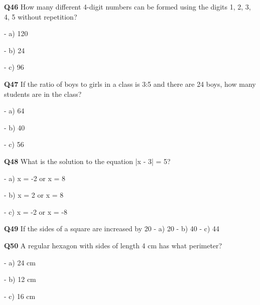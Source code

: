 \textbf{Q46} How many different 4-digit numbers can be formed using the digits 1, 2, 3, 4, 5 without repetition?\par
\quad - a) 120\par
\quad - b) 24\par
\quad - c) 96\par

\textbf{Q47} If the ratio of boys to girls in a class is 3:5 and there are 24 boys, how many students are in the class?\par
\quad - a) 64\par
\quad - b) 40\par
\quad - c) 56\par

\textbf{Q48} What is the solution to the equation |x - 3| = 5?\par
\quad - a) x = -2 or x = 8\par
\quad - b) x = 2 or x = 8\par
\quad - c) x = -2 or x = -8\par

\textbf{Q49} If the sides of a square are increased by 20%
\quad - a) 20%
\quad - b) 40%
\quad - c) 44%

\textbf{Q50} A regular hexagon with sides of length 4 cm has what perimeter?\par
\quad - a) 24 cm\par
\quad - b) 12 cm\par
\quad - c) 16 cm\par